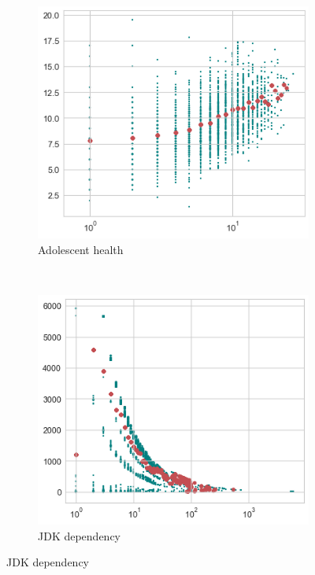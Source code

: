 \begin{figure}[h]
    \centering
    \begin{subfigure}[b]{0.3\textwidth}
        \includegraphics[width=\textwidth]{img/scatter_0}
        \caption*{Adolescent health}
    \end{subfigure}
    ~
    \begin{subfigure}[b]{0.3\textwidth}
        \includegraphics[width=\textwidth]{img/scatter_1}
        \caption*{JDK dependency}
    \end{subfigure}

\end{figure}
